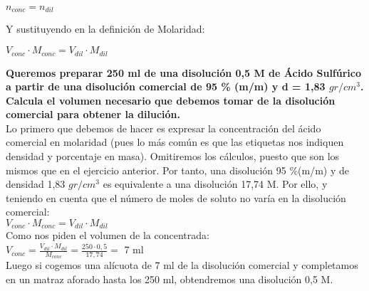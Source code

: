\begin{center}
	$n_{conc}=n_{dil}$
\end{center}

Y sustituyendo en la definición de Molaridad:\\

\begin{center}
	$V_{conc}\cdot M_{conc}=V_{dil}\cdot M_{dil}$
\end{center}

\begin{exercise}
	\textbf{Queremos preparar 250 ml de una disolución 0,5 M de Ácido Sulfúrico a partir de una disolución comercial de 95 \% (m/m) y d = 1,83 $gr/cm^3$. Calcula el volumen necesario que debemos tomar de la disolución comercial para obtener la dilución.}\\
	
	Lo primero que debemos de hacer es expresar la concentración del ácido comercial en molaridad (pues lo más común es que las etiquetas nos indiquen densidad y porcentaje en masa). Omitiremos los cálculos, puesto que son los mismos que en el ejercicio anterior. Por tanto, una disolución 95 \%(m/m) y de densidad 1,83 $gr/cm^3$ es equivalente a una disolución 17,74 M. Por ello, y teniendo en cuenta que el número de moles de soluto no varía en la disolución comercial:\\
	
	$V_{conc}\cdot M_{conc}=V_{dil}\cdot M_{dil}$\\
	
	Como nos piden el volumen de la concentrada:\\
	
	$V_{conc}=\frac{V_{dil}\cdot M_{dil}}{M_{conc}}= \frac{250\cdot 0,5}{17,74}=$ 7 ml\\
		
	Luego si cogemos una alícuota de 7 ml de la disolución comercial y completamos en un matraz aforado hasta los 250 ml, obtendremos una disolución 0,5 M.
	
\end{exercise}

